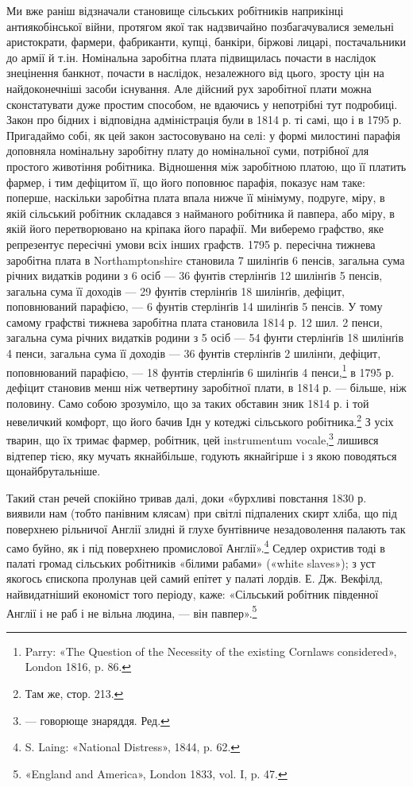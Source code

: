 Ми вже раніш відзначали становище сільських робітників
наприкінці антиякобінської війни, протягом якої так надзвичайно
позбагачувалися земельні аристократи, фармери, фабриканти,
купці, банкіри, біржові лицарі, постачальники до армії
й т.ін. Номінальна заробітна плата підвищилась почасти в наслідок
знецінення банкнот, почасти в наслідок, незалежного від
цього, зросту цін на найдоконечніші засоби існування. Але дійсний
рух заробітної плати можна сконстатувати дуже простим
способом, не вдаючись у непотрібні тут подробиці. Закон про
бідних і відповідна адміністрація були в 1814 р. ті самі, що і в
1795 р. Пригадаймо собі, як цей закон застосовувано на селі:
у формі милостині парафія доповняла номінальну заробітну
плату до номінальної суми, потрібної для простого животіння
робітника. Відношення між заробітною платою, що її платить
фармер, і тим дефіцитом її, що його поповнює парафія, показує
нам таке: поперше, наскільки заробітна плата впала нижче її
мінімуму, подруге, міру, в якій сільський робітник складався
з найманого робітника й павпера, або міру, в якій його перетворювано
на кріпака його парафії. Ми виберемо графство, яке
репрезентує пересічні умови всіх інших графств. 1795 р. пересічна
тижнева заробітна плата в Northamptonshire становила
7 шилінґів 6 пенсів, загальна сума річних видатків родини з
6 осіб — 36 фунтів стерлінґів 12 шилінґів 5 пенсів, загальна сума
її доходів — 29 фунтів стерлінґів 18 шилінґів, дефіцит, поповнюваний
парафією, — 6 фунтів стерлінґів 14 шилінґів 5 пенсів.
У тому самому графстві тижнева заробітна плата становила 1814 р.
12 шил. 2 пенси, загальна сума річних видатків родини з 5 осіб —
54 фунти стерлінґів 18 шилінґів 4 пенси, загальна сума її доходів
— 36 фунтів стерлінґів 2 шилінґи, дефіцит, поповнюваний
парафією, — 18 фунтів стерлінґів 6 шилінґів 4 пенси,\footnote{
Parry: «The Question of the Necessity of the existing Cornlaws
considered», London 1816, p. 86.
} в 1795 р.
дефіцит становив менш ніж четвертину заробітної плати, в
1814 р. — більше, ніж половину. Само собою зрозуміло, що за
таких обставин зник 1814 р. і той невеличкий комфорт, що його
бачив Ідн у котеджі сільського робітника.\footnote{
Там же, стор. 213.
} З усіх тварин,
що їх тримає фармер, робітник, цей instrumentum vocale,\footnote*{
— говорюще знаряддя. Ред.
} лишився
відтепер тією, яку мучать якнайбільше, годують якнайгірше і
з  якою поводяться щонайбрутальніше.

Такий стан речей спокійно тривав далі, доки «бурхливі повстання
1830 р. виявили нам (тобто панівним клясам) при світлі
підпалених скирт хліба, що під поверхнею рільничої Англії
злидні й глухе бунтівниче незадоволення палають так само буйно,
як і під поверхнею промислової Англії».\footnote{
S. Laing: «National Distress», 1844, p. 62.
} Седлер охристив тоді
в палаті громад сільських робітників «білими рабами» («white
slaves»); з уст якогось єпископа пролунав цей самий епітет у палаті
лордів. Е. Дж. Векфілд, найвидатніший економіст того періоду,
каже: «Сільський робітник південної Англії і не раб
і не вільна людина, — він павпер».\footnote{
«England and America», London 1833, vol. I, p. 47.
}

